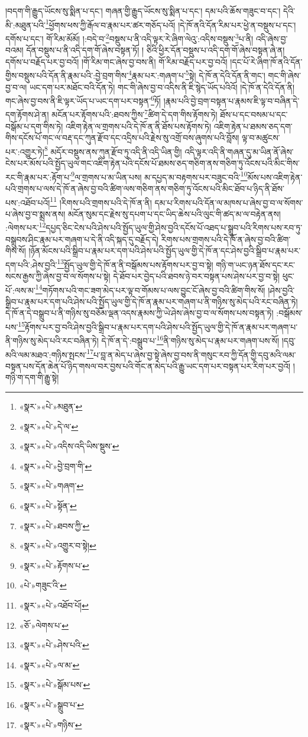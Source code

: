 །བདག་གི་རྒྱུད་ཡོངས་སུ་སྨིན་པ་དང་། གཞན་གྱི་རྒྱུད་ཡོངས་སུ་སྨིན་པ་དང་། དམ་པའི་ཆོས་གཟུང་བ་དང་། དེའི་མི་:མཐུན་པའི་\footnote{«སྣར་»«པེ་»མཐུན་}ཕྱོགས་ཕས་ཀྱི་རྒོལ་བ་རྣམ་པར་ཚར་གཅོད་པའོ། །དེ་ཁོ་ནའི་དོན་རིམ་པར་ཕྱེ་ན་བསྡུས་པ་དང་། དགོས་པ་དང་། གོ་རིམ་མོམོ། །:བདེ་བ་\footnote{«སྣར་»«པེ་»དེ་ལ་}བསྡུས་པ་ནི་འདི་ལྟར་རེ་ཞིག་ལེའུ་:འདིས་བསྡུས་\footnote{«སྣར་»«པེ་»འདིས་འདི་ཡིས་སྡུས་}པ་ནི། འདི་ཞེས་བྱ་བའམ། དོན་བསྡུས་པ་ནི་འདི་དག་གོ་ཞེས་བསྟན་ཏོ། །
ཅིའི་ཕྱིར་དོན་བསྡུས་པ་འདི་དག་གོ་ཞེས་བསྟན་ཞེ་ན། དགོས་པ་བརྗོད་པར་བྱ་བའོ། །གོ་རིམ་གང་ཞེས་བྱ་བས་ནི། གོ་རིམ་བརྗོད་པར་བྱ་བའོ། །དང་པོ་རེ་ཞིག་ཁོ་ནའི་དོན་གྱིས་བསྡུས་པའི་དོན་ནི་རྣམ་པའི་:བྱེ་བྲག་གིས་\footnote{«སྣར་»«པེ་»བྱེ་བྲག་གི་}རྣམ་པར་:གཞག་པ་\footnote{«སྣར་»«པེ་»གཞག་}སྟེ། དེ་ཁོ་ན་དེའི་དོན་ནི་གང་། གང་གི་ཞེས་བྱ་བ་ལ། ཡང་དག་པར་མཐོང་བའི་དོན་ཏེ། གང་གི་ཞེས་བྱ་བ་འདིས་ནི་ཇི་སྙེད་ཡོད་པའིའོ། །དེ་ཁོ་ན་དེའི་དོན་ནི། གང་ཞེས་བྱ་བས་ནི་ཇི་ལྟར་ཡོད་པ་ཡང་དག་པར་བསྟན་\footnote{«སྣར་»«པེ་»སྟོན་}ཏོ། །རྣམ་པའི་བྱེ་བྲག་བསྟན་པ་རྣམས་ཇི་ལྟ་བ་བཞིན་དེ་དག་རྟོགས་ཤེ་ན། མངོན་པར་རྟོགས་པའི་:ཐབས་ཀྱིས་\footnote{«སྣར་»«པེ་»ཐབས་ཀྱི་}ཚིག་དེ་དག་གིས་རྟོགས་ཏེ། ཐོས་པ་དང་བསམ་པ་དང་བསྒོམ་པ་དག་གིས་ཏེ། འཇིག་རྟེན་ལ་གྲགས་པའི་དེ་ཁོ་ན་ནི་ཐོས་པས་རྟོགས་ཏེ། འཇིག་རྟེན་པ་ཐམས་ཅད་དག་གིས་དངོས་པོ་གང་ལ་བརྡ་དང་ཀུན་རྫོབ་དང་འདྲིས་པའི་རྗེས་སུ་འགྲོ་བས་ཞུགས་པའི་བློས། ལྟ་བ་མཚུངས་པར་:འགྱུར་ཏེ།\footnote{«སྣར་»«པེ་»འགྱུར་བ་སྟེ།} མདོར་བསྡུས་ནས་ཀུན་རྫོབ་ཏུ་འདི་ནི་འདི་ཡིན་གྱི། འདི་ལྟར་འདི་ནི་གཞན་དུ་མ་ཡིན་ནོ་ཞེས་ངེས་པར་མོས་པའི་སྤྱོད་ཡུལ་གང་འཇིག་རྟེན་པའི་དངོས་པོ་ཐམས་ཅད་གཅིག་ནས་གཅིག་ཏུ་འོངས་པའི་མིང་གིས་རང་གི་རྣམ་པར་:རྟོག་པ་\footnote{«སྣར་»«པེ་»རྟོགས་པ་}ལ་གྲགས་པ་མ་ཡིན་པས། མ་དཔྱད་མ་བརྟགས་པར་བཟུང་བའི་\footnote{«པེ་»གཟུང་འི་}མོས་པས་འཇིག་རྟེན་པའི་གྲགས་པ་ལས་དེ་ཁོ་ན་ཞེས་བྱ་བའི་ཚིག་ལས་གཅིག་ནས་གཅིག་ཏུ་འོངས་པའི་མིང་ཐོབ་པ་ཉིད་ནི་ཐོས་པས་:འཐོབ་པའོ།\footnote{«སྣར་»«པེ་»འཐོབ་པོ།} །རིགས་པའི་གྲགས་པའི་དེ་ཁོ་ན་ནི། དམ་པ་རིགས་པའི་དོན་ལ་མཁས་པ་ཞེས་བྱ་བ་ལ་སོགས་པ་ཞེས་བྱ་བ་སྨྲས་ནས། མངོན་སུམ་དང་རྗེས་སུ་དཔག་པ་དང་ཡིད་ཆེས་པའི་ལུང་གི་ཚད་མ་ལ་བརྟེན་ནས། :ལེགས་པར་\footnote{«ཅོ་»ལེགས་པ་}དཔྱད་ཅིང་ངེས་པའི་ཤེས་པའི་སྤྱོད་ཡུལ་གྱི་ཤེས་བྱའི་དངོས་པོ་འཐད་པ་སྒྲུབ་པའི་རིགས་པས་རབ་ཏུ་བསྒྲུབས་ཤིང་རྣམ་པར་གཞག་པ་དེ་ནི་འདི་སྐད་དུ་བརྗོད་དེ། རིགས་པས་གྲགས་པའི་དེ་ཁོ་ན་ཞེས་བྱ་བའི་ཚིག་གིས་སོ། །ཉོན་མོངས་པའི་སྒྲིབ་པ་རྣམ་པར་དག་པའི་ཤེས་པའི་སྤྱོད་ཡུལ་གྱི་དེ་ཁོ་ན་དང་ཤེས་བྱའི་སྒྲིབ་པ་རྣམ་པར་དག་པའི་:ཤེས་བྱའི་\footnote{«སྣར་»«པེ་»ཤེས་པའི་}སྤྱོད་ཡུལ་གྱི་དེ་ཁོ་ན་ནི་བསྒོམས་པས་རྟོགས་པར་བྱ་བ་སྟེ། གཉི་ག་ཡང་ཉན་ཐོས་དང་རང་སངས་རྒྱས་ཀྱི་ཞེས་བྱ་བ་ལ་སོགས་པ་སྟེ། དེ་ཐོབ་པར་བྱེད་པའི་ཐབས་ཉེ་བར་བསྟན་པས་ཤེས་པར་བྱ་བ་སྟེ། ཕུང་པོ་:ལས་མ་\footnote{«སྣར་»«པེ་»ལ་མ་}གཏོགས་པའི་གང་ཟག་མེད་པར་ལྟ་བ་གོམས་པ་ལས་བྱུང་ངོ་ཞེས་བྱ་བའི་ཚིག་གིས་སོ། །ཤེས་བྱའི་སྒྲིབ་པ་རྣམ་པར་དག་པའི་ཤེས་པའི་སྤྱོད་ཡུལ་གྱི་དེ་ཁོ་ན་རྣམ་པར་གཞག་པ་ནི་གཉིས་སུ་མེད་པའི་རང་བཞིན་ཏེ། དེ་ཁོ་ན་དེ་བསྒྲུབ་པ་ནི་གཉིས་སུ་བཅོམ་ལྡན་འདས་རྣམས་ཀྱི་ཡེ་ཤེས་ཞེས་བྱ་བ་ལ་སོགས་པས་བསྟན་ཏེ། :བསྒོམས་པས་\footnote{«སྣར་»«པེ་»སྒོམ་པས་}རྟོགས་པར་བྱ་བའི་ཤེས་བྱའི་སྒྲིབ་པ་རྣམ་པར་དག་པའི་ཤེས་པའི་སྤྱོད་ཡུལ་གྱི་དེ་ཁོ་ན་རྣམ་པར་གཞག་པ་ནི་གཉིས་སུ་མེད་པའི་རང་བཞིན་ཏེ། དེ་ཁོ་ན་དེ་:བསྒྲུབ་པ་\footnote{«སྣར་»«པེ་»སྒྲུབ་པ་}ནི་གཉིས་སུ་མེད་པ་རྣམ་པར་གཞག་པས་སོ། །དབུ་མའི་ལམ་མཐའ་:གཉིས་སྤངས་\footnote{«སྣར་»«པེ་»གཉིས་}པ་བླ་ན་མེད་པ་ཞེས་བྱ་སྟེ་ཞེས་བྱ་བས་ནི་གསུང་རབ་ཀྱི་དོན་གྱི་དབུ་མའི་ལམ་བསྟན་པས་དོན་ཆེན་པོ་ཉིད་གསལ་བར་བྱས་པའི་གོང་ན་མེད་པའི་རྒྱུ་ཡང་དག་པར་བསྟན་པར་རིག་པར་བྱའོ། །གཉི་ག་དག་གི་རྒྱུ་སྟེ། 
